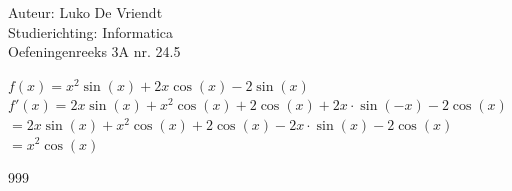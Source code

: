 \documentclass[a4paper]{article}
\begin{document}
\noindent \large Auteur: Luko De Vriendt\\
\noindent \large Studierichting: Informatica\\
\noindent \large Oefeningenreeks 3A nr. 24.5\\

\medskip

\normalsize

$f(x) = x^2\sin(x) + 2x\cos(x) - 2\sin(x)$ \\

$f'(x) = 2x\sin(x) + x^2\cos(x) + 2\cos(x) + 2x\cdot\sin\left(-x\right) - 2\cos(x)$ \\

$= 2x\sin(x) + x^2\cos(x) + 2\cos(x) - 2x\cdot\sin(x) - 2\cos(x)$ \\

$= x^2\cos(x)$ \\
	
\begin{thebibliography}{999}
\end{thebibliography}
\end{document}
